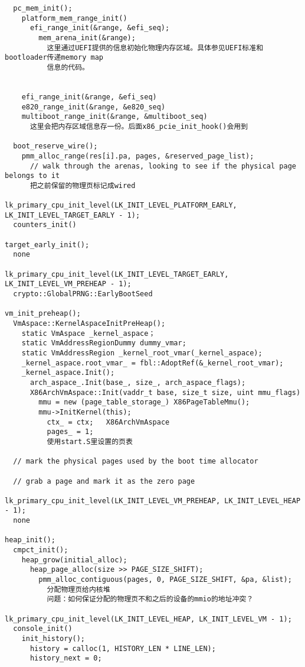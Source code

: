 \begin{verbatim}
  pc_mem_init();
    platform_mem_range_init()
      efi_range_init(&range, &efi_seq);
        mem_arena_init(&range);
          这里通过UEFI提供的信息初始化物理内存区域。具体参见UEFI标准和bootloader传递memory map
          信息的代码。

        
    efi_range_init(&range, &efi_seq)
    e820_range_init(&range, &e820_seq)
    multiboot_range_init(&range, &multiboot_seq)
      这里会把内存区域信息存一份。后面x86_pcie_init_hook()会用到

  boot_reserve_wire();
    pmm_alloc_range(res[i].pa, pages, &reserved_page_list);
      // walk through the arenas, looking to see if the physical page belongs to it
      把之前保留的物理页标记成wired

lk_primary_cpu_init_level(LK_INIT_LEVEL_PLATFORM_EARLY, LK_INIT_LEVEL_TARGET_EARLY - 1);
  counters_init()

target_early_init();
  none

lk_primary_cpu_init_level(LK_INIT_LEVEL_TARGET_EARLY, LK_INIT_LEVEL_VM_PREHEAP - 1);
  crypto::GlobalPRNG::EarlyBootSeed

vm_init_preheap();
  VmAspace::KernelAspaceInitPreHeap();
    static VmAspace _kernel_aspace；
    static VmAddressRegionDummy dummy_vmar;
    static VmAddressRegion _kernel_root_vmar(_kernel_aspace);
    _kernel_aspace.root_vmar_ = fbl::AdoptRef(&_kernel_root_vmar);
    _kernel_aspace.Init();
      arch_aspace_.Init(base_, size_, arch_aspace_flags);
      X86ArchVmAspace::Init(vaddr_t base, size_t size, uint mmu_flags)
        mmu = new (page_table_storage_) X86PageTableMmu();
        mmu->InitKernel(this);
          ctx_ = ctx;   X86ArchVmAspace
          pages_ = 1;
          使用start.S里设置的页表

  // mark the physical pages used by the boot time allocator

  // grab a page and mark it as the zero page

lk_primary_cpu_init_level(LK_INIT_LEVEL_VM_PREHEAP, LK_INIT_LEVEL_HEAP - 1);
  none

heap_init();
  cmpct_init();
    heap_grow(initial_alloc);
      heap_page_alloc(size >> PAGE_SIZE_SHIFT);
        pmm_alloc_contiguous(pages, 0, PAGE_SIZE_SHIFT, &pa, &list);
          分配物理页给内核堆
          问题：如何保证分配的物理页不和之后的设备的mmio的地址冲突？

lk_primary_cpu_init_level(LK_INIT_LEVEL_HEAP, LK_INIT_LEVEL_VM - 1);
  console_init()
    init_history();
      history = calloc(1, HISTORY_LEN * LINE_LEN);
      history_next = 0;


\end{verbatim}
